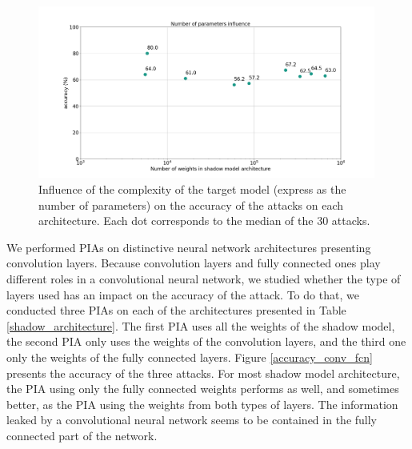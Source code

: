 \documentclass[11pt]{article}
\begin{document}
\begin{figure}[h!]
    \centering
    \begin{minipage}{\textwidth}
        \centering
        \includegraphics[width=0.99\textwidth]{accuracy_weight.png} %
        \caption{Influence of the complexity of the target model (express as the number of parameters) on the accuracy of the attacks on each architecture. Each dot corresponds to the median of the 30 attacks.}
        \label{accuracy_weight}
    \end{minipage}\hfill
\end{figure}

We performed PIAs on distinctive neural network architectures presenting convolution layers. Because convolution layers and fully connected ones play different roles in a convolutional neural network, we studied whether the type of layers used has an impact on the accuracy of the attack. To do that, we conducted three PIAs on each of the architectures presented in Table \ref{shadow_architecture}. The first PIA uses all the weights of the shadow model, the second PIA only uses the weights of the convolution layers, and the third one only the weights of the fully connected layers. Figure \ref{accuracy_conv_fcn} presents the accuracy of the three attacks. For most shadow model architecture, the PIA using only the fully connected weights performs as well, and sometimes better, as the PIA using the weights from both types of layers. The information leaked by a convolutional neural network seems to be contained in the fully connected part of the network.\\
\end{document}
